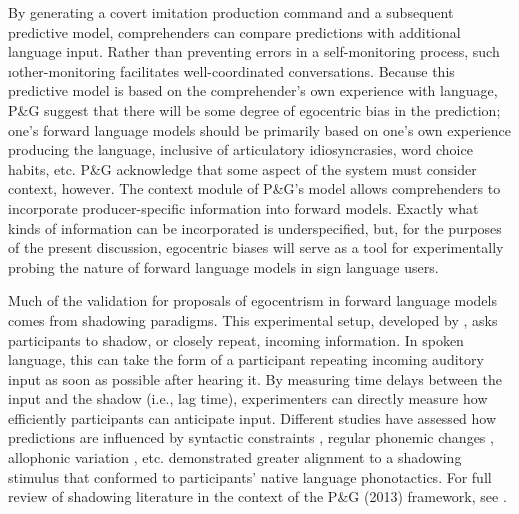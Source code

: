             By generating a covert imitation production command and a subsequent predictive model, comprehenders can compare predictions with additional language input. Rather than preventing errors in a self-monitoring process, such \i{other-monitoring} facilitates well-coordinated conversations. Because this predictive model is based on the comprehender's own experience with language, P\&G suggest that there will be some degree of egocentric bias in the prediction; one's forward language models should be primarily based on one's own experience producing the language, inclusive of articulatory idiosyncrasies, word choice habits, etc. P\&G acknowledge that some aspect of the system must consider context, however. The context module of P\&G's model allows comprehenders to incorporate producer-specific information into forward models. Exactly what kinds of information can be incorporated is underspecified, but, for the purposes of the present discussion, egocentric biases will serve as a tool for experimentally probing the nature of forward language models in sign language users.\par
            \label{sec:intro_shad_spoken} Much of the validation for proposals of egocentrism in forward language models comes from shadowing paradigms. This experimental setup, developed by , asks participants to shadow, or closely repeat, incoming information. In spoken language, this can take the form of a participant repeating incoming auditory input as soon as possible after hearing it. By measuring time delays between the input and the shadow (i.e., lag time), experimenters can directly measure how efficiently participants can anticipate input. Different studies have assessed how predictions are influenced by syntactic constraints \cite{marslen1985}, regular phonemic changes \cite{brouwer2010,fowler2003}, allophonic variation \cite{honorof2011}, etc. 
             demonstrated greater alignment to a shadowing stimulus that conformed to participants' native language phonotactics. For full review of shadowing literature in the context of the P\&G (2013) framework, see . \par
